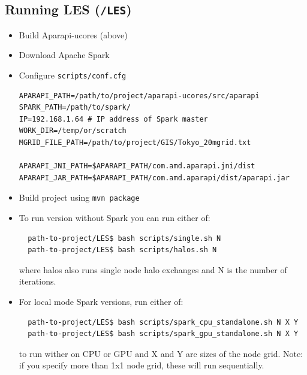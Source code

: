 \documentclass{l4proj}
\begin{document}
\begin{appendices}
\section{Running LES (\texttt{/LES})}

\begin{itemize}
\item Build Aparapi-ucores (above)
\item Download Apache Spark
\item Configure \texttt{scripts/conf.cfg}
\begin{verbatim}
APARAPI_PATH=/path/to/project/aparapi-ucores/src/aparapi
SPARK_PATH=/path/to/spark/
IP=192.168.1.64 # IP address of Spark master
WORK_DIR=/temp/or/scratch
MGRID_FILE_PATH=/path/to/project/GIS/Tokyo_20mgrid.txt

APARAPI_JNI_PATH=$APARAPI_PATH/com.amd.aparapi.jni/dist
APARAPI_JAR_PATH=$APARAPI_PATH/com.amd.aparapi/dist/aparapi.jar
\end{verbatim}

\item Build project using \texttt{mvn package}

\item To run version without Spark you can run either of:
\begin{verbatim}
  path-to-project/LES$ bash scripts/single.sh N
  path-to-project/LES$ bash scripts/halos.sh N
\end{verbatim}
where halos also runs single node halo exchanges and N is the number of iterations.

\item For local mode Spark versions, run either of:
\begin{verbatim}
  path-to-project/LES$ bash scripts/spark_cpu_standalone.sh N X Y
  path-to-project/LES$ bash scripts/spark_gpu_standalone.sh N X Y
\end{verbatim}
to run wither on CPU or GPU and X and Y are sizes of the node grid. 
Note: if you specify more than 1x1 node grid, these will run sequentially.


\end{itemize}
\end{appendices}
\end{document}
